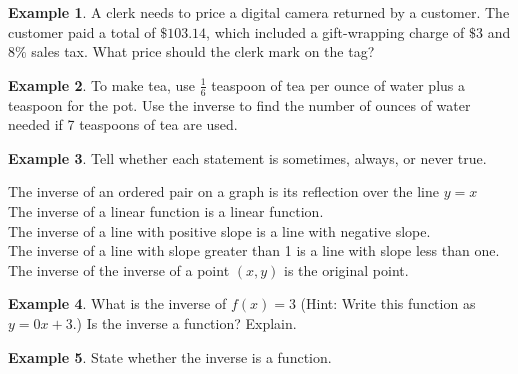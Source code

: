 \documentclass{report}
\theoremstyle{definition}
\newtheorem{example}{\bf Example}
\begin{document}
\begin{example}
A clerk needs to price a digital camera returned by a customer. The customer paid a total of $\$103.14$, which included a gift-wrapping charge of $\$3$ and $8\%$ sales tax. What price should the clerk mark on the tag?
\end{example}

\vfill

\begin{example}
To make tea, use $\displaystyle \frac{1}{6}$ teaspoon of tea  per ounce of water plus a teaspoon for the pot. Use the inverse to find the number of ounces of water needed if 7 teaspoons of tea are used.
\end{example}

\vfill

 \newpage
\begin{example}
\noindent Tell whether each statement is sometimes, always, or never true.\\
\end{example}

The inverse of an ordered pair on a graph is its reflection over the line $y=x$\\

The inverse of a linear function is a linear function.\\

The inverse of a line with positive slope is a line with negative slope.\\

The inverse of a line with slope greater than 1 is a line with slope less than one.\\

The inverse of the inverse of a point $(x,y)$ is the original point.\\

\vspace{1cm}

\begin{example}
\noindent What is the inverse of $f(x)=3$ (Hint: Write this function as $y=0x+3$.) Is the inverse a function? Explain.\\
\end{example}
\vfill


\begin{example}
State whether the inverse is a function.
\end{example}
\end{document}
